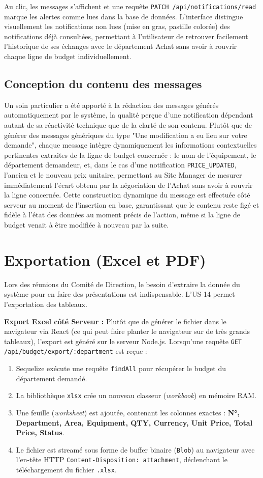 Au clic, les messages s'affichent et une requête \texttt{PATCH /api/notifications/read} marque les alertes comme lues dans la base de données. L'interface distingue visuellement les notifications non lues (mise en gras, pastille colorée) des notifications déjà consultées, permettant à l'utilisateur de retrouver facilement l'historique de ses échanges avec le département Achat sans avoir à rouvrir chaque ligne de budget individuellement.

\subsection{Conception du contenu des messages}
Un soin particulier a été apporté à la rédaction des messages générés automatiquement par le système, la qualité perçue d'une notification dépendant autant de sa réactivité technique que de la clarté de son contenu. Plutôt que de générer des messages génériques du type "Une modification a eu lieu sur votre demande", chaque message intègre dynamiquement les informations contextuelles pertinentes extraites de la ligne de budget concernée : le nom de l'équipement, le département demandeur, et, dans le cas d'une notification \texttt{PRICE\_UPDATED}, l'ancien et le nouveau prix unitaire, permettant au Site Manager de mesurer immédiatement l'écart obtenu par la négociation de l'Achat sans avoir à rouvrir la ligne concernée. Cette construction dynamique du message est effectuée côté serveur au moment de l'insertion en base, garantissant que le contenu reste figé et fidèle à l'état des données au moment précis de l'action, même si la ligne de budget venait à être modifiée à nouveau par la suite.

\section{Exportation (Excel et PDF)}
\label{sec:export_excel_pdf}
Lors des réunions du Comité de Direction, le besoin d'extraire la donnée du système pour en faire des présentations est indispensable. L'US-14 permet l'exportation des tableaux.

\textbf{Export Excel côté Serveur :}
Plutôt que de générer le fichier dans le navigateur via React (ce qui peut faire planter le navigateur sur de très grands tableaux), l'export est généré sur le serveur Node.js.
Lorsqu'une requête \texttt{GET /api/budget/export/:department} est reçue :
\begin{enumerate}
    \item Sequelize exécute une requête \texttt{findAll} pour récupérer le budget du département demandé.
    \item La bibliothèque \texttt{xlsx} crée un nouveau classeur (\textit{workbook}) en mémoire RAM.
    \item Une feuille (\textit{worksheet}) est ajoutée, contenant les colonnes exactes : \textbf{N°, Department, Area, Equipment, QTY, Currency, Unit Price, Total Price, Status}.
    \item Le fichier est streamé sous forme de buffer binaire (\texttt{Blob}) au navigateur avec l'en-tête HTTP \texttt{Content-Disposition: attachment}, déclenchant le téléchargement du fichier \texttt{.xlsx}.
\end{enumerate}

